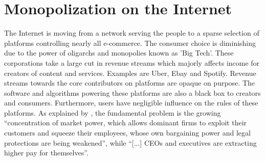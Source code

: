 \section{Monopolization on the Internet}
The Internet is moving from a network serving the people to a sparse selection of platforms controlling nearly all e-commerce. 
The consumer choice is diminishing due to the power of oligarchs and monopolies known as 'Big Tech'. 
These corporations take a large cut in revenue streams which majorly affects income for creators of content and services. Examples are Uber, %
Ebay and Spotify. Revenue streams towards the core contributors on platforms are opaque on purpose. The software and algorithms powering these platforms are also a black box to creators and consumers. Furthermore, users have negligible influence on the rules of these platforms. 
As explained by \citep{stiglitz2019market}, the fundamental problem is the growing ``concentration of market power, which allows dominant firms to exploit their customers and squeeze their employees, whose own bargaining power and legal protections are being weakened'', while ``[...] CEOs and executives are extracting higher pay for themselves''.

